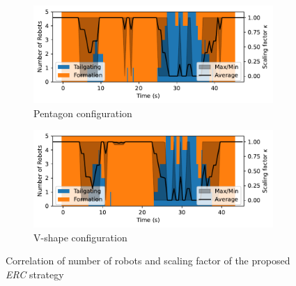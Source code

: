 \begin{figure}[!h]
\begin{subfigure}[b]{0.49\textwidth}
    
    \centering
    \includegraphics[width=\linewidth]{paper2/images/mode_edc_shape1.pdf}
    \caption{Pentagon configuration}
    \label{fig:1mode_edc1}
\end{subfigure}
\begin{subfigure}[b]{0.49\textwidth}
    \centering
    \includegraphics[width=\linewidth]{paper2/images/mode_edc_shape2.pdf}
    \caption{V-shape configuration}
    \label{fig:1mode_edc2}
\end{subfigure}
\caption{Correlation of number of robots and scaling factor of the proposed \textit{ERC} strategy}
\label{fig:1mode}
\end{figure}


